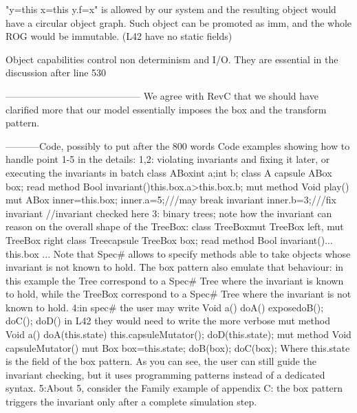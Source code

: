 "y=this x=this y.f=x" is allowed by our system and the resulting object would have a circular object graph.
Such object can be promoted as imm, and the whole ROG would be immutable.
(L42 have no static fields)

Object capabilities control non determinism and I/O. They are essential in the discussion after line 530

------------------------------------------
We agree with RevC that we should have clarified more
that our model essentially imposes the box and the transform pattern.


-----------Code, possibly to put after the 800 words
Code examples showing how to handle point 1-5 in the details:
1,2: violating invariants and fixing it later, or executing the invariants in batch
class ABox{int a;int b;}
class A{
 capsule ABox box;
 read method Bool invariant(){this.box.a>this.box.b;}
 mut method Void play(){
   mut ABox inner=this.box;
   inner.a=5;///may break invariant
   inner.b=3;///fix invariant
   //invariant checked here
   }}
3: binary trees; note how the invariant can reason on the overall shape of the TreeBox:
class TreeBox{mut TreeBox left, mut TreeBox right}
class Tree{capsule TreeBox box; 
  read method Bool invariant(){... this.box ...}}
Note that Spec# allows to specify methods able to take objects whose invariant is not known to hold.
The box pattern also emulate that behaviour: in this example the Tree 
correspond to a Spec# Tree where the invariant
is known to hold, while the TreeBox correspond to a Spec# Tree where the invariant is not known to hold.
4:in spec# the user may write 
    Void a() {doA() expose{doB(); doC();} doD()}
in L42 they would need to write the more verbose
    mut method Void a() {doA(this.state) this.capsuleMutator(); doD(this.state);}
    mut method Void capsuleMutator() {mut Box box=this.state; doB(box); doC(box);}
Where this.state is the field of the box pattern.
As you can see, the user can still guide the invariant checking, but it uses programming patterns
instead of a dedicated syntax.
5:About 5, consider the Family example of appendix C: the box pattern triggers the
invariant only after a complete simulation step.
